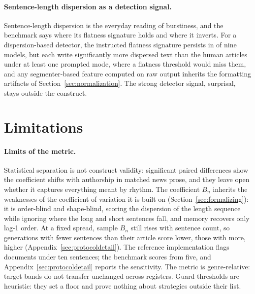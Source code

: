 \documentclass{article}
\begin{document}
\paragraph{Sentence-length dispersion as a detection signal.}
Sentence-length dispersion is the everyday reading of burstiness, and the benchmark says where its flatness signature holds and where it inverts. For a dispersion-based detector, the instructed flatness signature persists in  of nine models, but  each write significantly more dispersed text than the human articles under at least one prompted mode, where a flatness threshold would miss them, and any segmenter-based feature computed on raw output inherits the formatting artifacts of Section~\ref{sec:normalization}. The strong detector signal, surprisal, stays outside the construct.

\section{Limitations}\label{sec:limitations}

\paragraph{Limits of the metric.}
Statistical separation is not construct validity: significant paired
differences show the coefficient shifts with authorship in matched news prose, and they leave open
whether it captures everything meant by rhythm.
The coefficient $B_n$ inherits the weaknesses of the coefficient of variation it is built on
(Section~\ref{sec:formalizing}): it is order-blind and shape-blind,
scoring the dispersion of the length sequence while ignoring where the long and short sentences fall, and memory recovers only
lag-1 order. At a fixed spread, sample $B_n$ still rises with sentence count, so generations with fewer sentences than their article score lower, those with more, higher (Appendix~\ref{sec:protocoldetail}). The reference implementation flags documents under ten sentences; the benchmark scores from
five, and Appendix~\ref{sec:protocoldetail} reports the sensitivity. The metric is genre-relative:
target bands do not transfer unchanged across registers. Guard thresholds are heuristic: they set a floor and prove nothing about
strategies outside their list.
\end{document}

